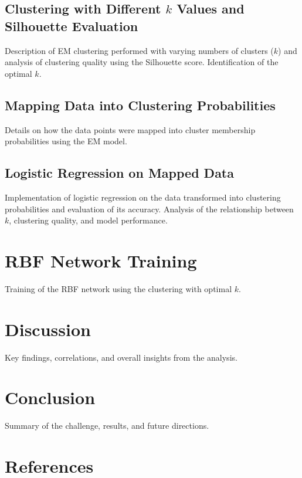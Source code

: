 \documentclass[a4paper,12pt]{article}
\begin{document}
\subsection{Clustering with Different \(k\) Values and Silhouette Evaluation}
Description of EM clustering performed with varying numbers of clusters (\(k\)) and analysis of clustering quality using the Silhouette score. Identification of the optimal \(k\).

\subsection{Mapping Data into Clustering Probabilities}
Details on how the data points were mapped into cluster membership probabilities using the EM model.

\subsection{Logistic Regression on Mapped Data}
Implementation of logistic regression on the data transformed into clustering probabilities and evaluation of its accuracy. Analysis of the relationship between \(k\), clustering quality, and model performance.


\section{RBF Network Training}
\label{sec:rbf-network}
Training of the RBF network using the clustering with optimal \(k\).

\section{Discussion}
\label{sec:discussion}
Key findings, correlations, and overall insights from the analysis.

\section{Conclusion}
\label{sec:conclusion}
Summary of the challenge, results, and future directions.

\section*{References}
\label{sec:references}
\end{document}
